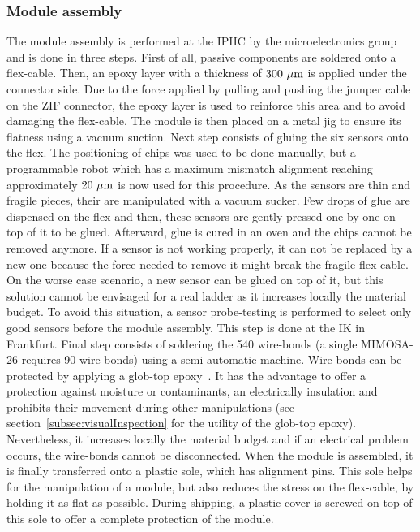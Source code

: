     \subsubsection{Module assembly}
    \label{subsec:modAssembly}

    The module assembly is performed at the \gls{IPHC} by the microelectronics group and is done in three steps.
    First of all, passive components are soldered onto a flex-cable.
    Then, an epoxy layer with a thickness of $300~\rm{\mu m}$ is applied under the connector side.
    Due to the force applied by pulling and pushing the jumper cable on the \gls{ZIF} connector, the epoxy layer is used to reinforce this area and to avoid damaging the flex-cable.
    The module is then placed on a metal jig to ensure its flatness using a vacuum suction.
    Next step consists of gluing the six sensors onto the flex.
    The positioning of chips was used to be done manually, but a programmable robot which has a maximum mismatch alignment reaching approximately $20~\mu\rm{m}$ is now used for this procedure.
    As the sensors are thin and fragile pieces, their are manipulated with a vacuum sucker.
    Few drops of glue are dispensed on the flex and then, these sensors are gently pressed one by one on top of it to be glued.
    Afterward, glue is cured in an oven and the chips cannot be removed anymore.
    If a sensor is not working properly, it can not be replaced by a new one because the force needed to remove it might break the fragile flex-cable.
    On the worse case scenario, a new sensor can be glued on top of it, but this solution cannot be envisaged for a real ladder as it increases locally the material budget.
    To avoid this situation, a sensor probe-testing is performed to select only good sensors before the module assembly.
    This step is done at the IK in Frankfurt.
    Final step consists of soldering the 540 wire-bonds (a single \gls{MIMOSA}-26 requires 90 wire-bonds) using a semi-automatic machine.
    Wire-bonds can be protected by applying a glob-top epoxy~\cite{minges1989electronic}.
    It has the advantage to offer a protection against moisture or contaminants, an electrically insulation and prohibits their movement during other manipulations (see section~\ref{subsec:visualInspection} for the utility of the glob-top epoxy). 
    Nevertheless, it increases locally the material budget and if an electrical problem occurs, the wire-bonds cannot be disconnected.
    When the module is assembled, it is finally transferred onto a plastic sole, which has alignment pins.
    This sole helps for the manipulation of a module, but also reduces the stress on the flex-cable, by holding it as flat as possible.
    During shipping, a plastic cover is screwed on top of this sole to offer a complete protection of the module.


